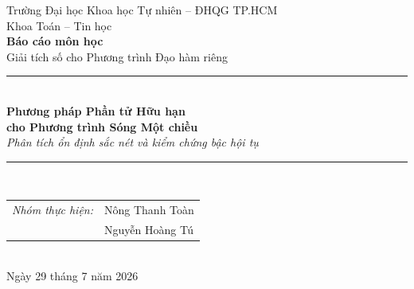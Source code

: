 \documentclass[11pt,a4paper]{article}
\theoremstyle{plain}
\theoremstyle{definition}
\theoremstyle{remark}
\newcommand{\Hone}{H^{1}}
\newcommand{\Ltwo}{L^{2}}
\newcommand{\dt}{\Delta t}
\newcommand{\lammax}{\lambda_{\max}}
\begin{document}
\begin{titlepage}
\centering
\vspace*{1.6cm}

{\large Trường Đại học Khoa học Tự nhiên -- ĐHQG TP.HCM}\\[0.25cm]
{\large Khoa Toán -- Tin học}\\[2.6cm]

{\Large\bfseries Báo cáo môn học}\\[0.5cm]
{\Large Giải tích số cho Phương trình Đạo hàm riêng}\\[1.4cm]

\rule{\linewidth}{0.5pt}\\[0.55cm]
{\huge\bfseries Phương pháp Phần tử Hữu hạn\\[0.28cm]
cho Phương trình Sóng Một chiều}\\[0.45cm]
{\large\itshape Phân tích ổn định sắc nét và kiểm chứng bậc hội tụ}\\[0.5cm]
\rule{\linewidth}{0.5pt}\\[2.2cm]

{\large
\begin{tabular}{r@{\hspace{0.8em}}l}
\textit{Nhóm thực hiện:} & Nông Thanh Toàn \\[0.2cm]
                         & Nguyễn Hoàng Tú \\
\end{tabular}}\\[2.6cm]

{\large Ngày 29 tháng 7 năm 2026}

\vfill
\end{titlepage}

\begin{abstract}
\noindent
Báo cáo trình bày đầy đủ việc xây dựng, phân tích và kiểm chứng số phương
pháp phần tử hữu hạn (FEM) với phần tử tuyến tính từng khúc $P_1$ kết hợp sơ
đồ sai phân trung tâm (leapfrog) cho phương trình sóng một chiều với điều
kiện biên Dirichlet thuần nhất. Ngoài phần dẫn xuất mô hình và chứng minh
hội tụ, đóng góp chính của báo cáo là \emph{phân tích ổn định sắc nét}: bằng
cách tính tường minh phổ của cặp ma trận $(S,T)$, chúng tôi chứng minh điều
kiện ổn định cần và đủ của sơ đồ là
\[
  \dt \;<\; \frac{2}{c\sqrt{\lammax(T^{-1}S)}},
\]
từ đó suy ra hai hằng số CFL khác nhau rõ rệt: $\dt < h/(c\sqrt{3})$ đối với
\emph{ma trận khối lượng đầy đủ} và $\dt < h/c$ đối với \emph{ma trận khối
lượng gộp}. Kết quả này giải thích chính xác vì sao ước lượng quen thuộc
$\dt \le h/c$ là \emph{không đủ} khi dùng khối lượng đầy đủ. Thực nghiệm số
xác nhận ngưỡng lý thuyết tới bốn chữ số có nghĩa, đồng thời tái lập đúng
bậc hội tụ $\mathcal{O}(h^{2})$ trong chuẩn $\Ltwo$ và $\mathcal{O}(h)$
trong nửa chuẩn $\Hone$.

\medskip
\noindent\textbf{Từ khóa:} phương trình sóng, phần tử hữu hạn, sai phân trung
tâm, điều kiện CFL, khối lượng gộp, phép chiếu Ritz.
\end{abstract}
\end{document}
